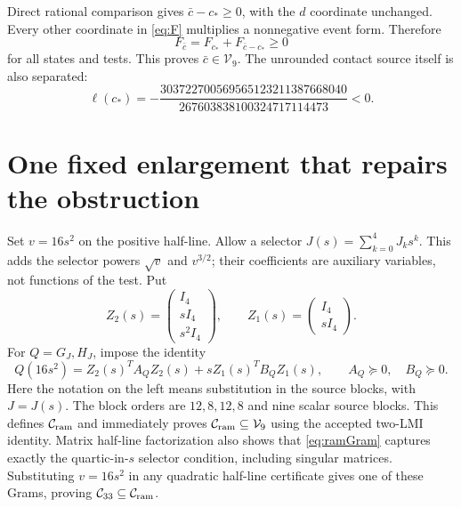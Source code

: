 \documentclass[10pt]{article}
\newcommand{\V}{\mathcal V_9}
\newcommand{\Cq}{\mathcal C_{33}}
\newcommand{\Cr}{\mathcal C_{\rm ram}}
\begin{document}
Direct rational comparison gives $\bar c-c_*\geq0$, with the $d$ coordinate
unchanged. Every other coordinate in \eqref{eq:F} multiplies a nonnegative
event form. Therefore
\[
                       F_{\bar c}=F_{c_*}+F_{\bar c-c_*}\geq0
\]
for all states and tests. This proves $\bar c\in\V$. The unrounded contact
source itself is also separated:
\begin{equation}
\ell(c_*)=-\frac{303722700569565123211387668040}
                    {267603838100324717114473}<0.           \label{eq:oldnegative}
\end{equation}

\section{One fixed enlargement that repairs the obstruction}
\label{sec:enlargement}
Set $v=16s^2$ on the positive half-line. Allow a selector
$J(s)=\sum_{k=0}^4J_ks^k$. This adds the selector powers $\sqrt v$ and
$v^{3/2}$; their coefficients are auxiliary variables, not functions of the
test. Put
\[
Z_2(s)=\begin{pmatrix}I_4\\sI_4\\s^2I_4\end{pmatrix},
\qquad Z_1(s)=\begin{pmatrix}I_4\\sI_4\end{pmatrix}.
\]
For $Q=G_J,H_J$, impose the identity
\begin{equation}
Q(16s^2)=Z_2(s)^TA_QZ_2(s)+sZ_1(s)^TB_QZ_1(s),
\qquad A_Q\succeq0,\quad B_Q\succeq0.                    \label{eq:ramGram}
\end{equation}
Here the notation on the left means substitution in the source blocks,
with $J=J(s)$. The block orders are $12,8,12,8$ and nine scalar source
blocks. This defines $\Cr$ and immediately proves $\Cr\subseteq\V$
using the accepted two-LMI identity. Matrix half-line factorization also
shows that \eqref{eq:ramGram} captures exactly the quartic-in-$s$ selector
condition, including singular matrices. Substituting $v=16s^2$ in any
quadratic half-line certificate gives one of these Grams, proving
$\Cq\subseteq\Cr$.
\end{document}
